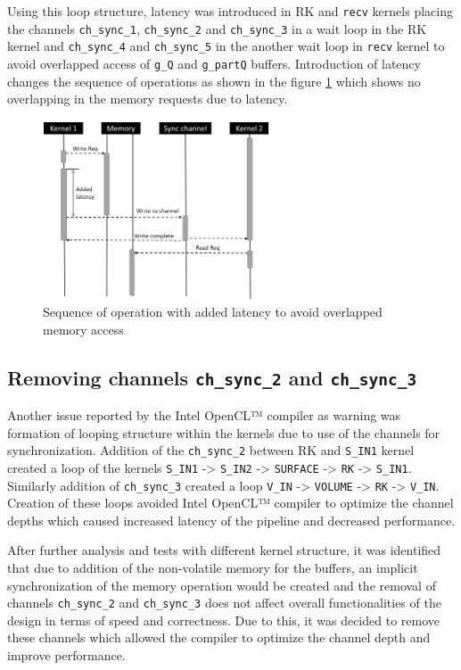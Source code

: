 Using this loop structure, latency was introduced
in RK and \texttt{recv} kernels placing the channels \texttt{ch\_sync\_1},
\texttt{ch\_sync\_2} and \texttt{ch\_sync\_3} in a wait loop in the RK kernel and \texttt{ch\_sync\_4}
and \texttt{ch\_sync\_5} in the another wait loop in \texttt{recv} kernel to avoid
overlapped access of \texttt{g\_Q} and \texttt{g\_partQ} buffers. Introduction
of latency changes the sequence of operations as shown in the figure \ref{fig:resolved_latency}
which shows no overlapping in the memory requests due to latency.

\begin{figure}[ht]%
    \centering
    \includegraphics[width=0.6\textwidth]{images/resolved_latency}
    \caption{Sequence of operation with added latency to avoid overlapped
    memory access}
    \label{fig:resolved_latency}
\end{figure}

\subsection*{Removing channels \texttt{ch\_sync\_2} and \texttt{ch\_sync\_3}}

Another issue reported by the Intel OpenCL™ compiler as warning was formation of looping
structure within the kernels due to use of the channels for synchronization.
Addition of the \texttt{ch\_sync\_2} between RK and \texttt{S\_IN1} kernel created
a loop of the kernels \texttt{S\_IN1} -> \texttt{S\_IN2} -> \texttt{SURFACE} -> \texttt{RK} -> \texttt{S\_IN1}.
Similarly addition of \texttt{ch\_sync\_3} created a loop \texttt{V\_IN} -> \texttt{VOLUME} -> \texttt{RK} -> \texttt{V\_IN}.
Creation of these loops avoided Intel OpenCL™ compiler to optimize the channel depths
which caused increased latency of the pipeline and decreased performance.

After further analysis and tests with different kernel structure, it was identified that
due to addition of the non-volatile memory for the buffers, an implicit synchronization of
the memory operation would be created and the removal of channels \texttt{ch\_sync\_2} and
\texttt{ch\_sync\_3} does not affect overall functionalities of the design in terms of speed
and correctness. Due to this, it was decided to remove these channels which allowed the
compiler to optimize the channel depth and improve performance.

